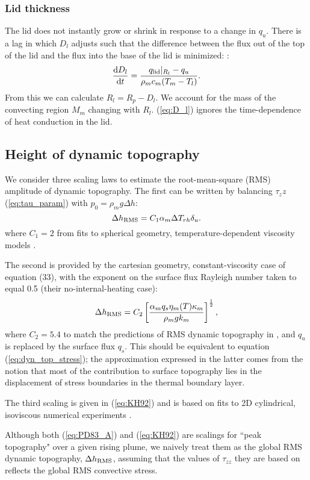 \subsubsection{Lid thickness}


The lid does not instantly grow or shrink in response to a change in $q_{u}$. There is a lag in which $D_l$ adjusts such that the difference between the flux out of the top of the lid and the flux into the base of the lid is minimized: \citep{Thiriet2019}:
\begin{equation}\label{eq:D_l}
\frac{\mathrm{d} D_l}{\mathrm{d} t} = \frac{q_{\rm lid}\vert_{R_l} -q_u}{\rho_m c_{m} (T_m - T_l)} . 
\end{equation}
From this we can calculate $R_l = R_p - D_l$. We account for the mass of the convecting region $M_m$ changing with $R_l$. (\ref{eq:D_l}) ignores the time-dependence of heat conduction in the lid.




\subsection{Height of dynamic topography}

We consider three scaling laws to estimate the root-mean-square (RMS) amplitude of dynamic topography. The first can be written by balancing  $\tau_zz$ (\ref{eq:tau_param}) with $p_0 = \rho_m g \Delta h$:
\begin{equation}\label{eq:dyn_top_stress_A}
\Delta h_{\rm RMS} = C_1 \alpha_m \Delta T_{rh} \delta_u.
\end{equation}
where $C_1 = 2$ from fits to spherical geometry, temperature-dependent viscosity models \citep{Reese2005}.

The second is provided by the cartesian geometry, constant-viscosity case of \citet{Parsons1983} equation (33), with the exponent on the surface flux Rayleigh number taken to equal 0.5 (their no-internal-heating case):
\begin{equation}\label{eq:PD83_A}
\Delta h_{\rm RMS} = C_2 \left[\frac{\alpha_m q_{s} \eta_m(T) \kappa_m}{\rho_m g k_m}\right]^\frac{1}{2},
\end{equation}
where $C_2 = 5.4$ to match the predictions of RMS dynamic topography in \citet{Lees2019}, and $q_u$ is replaced by the surface flux $q_s$. This should be equivalent to equation (\ref{eq:dyn_top_stress}); the approximation expressed in the latter comes from the notion that most of the contribution to surface topography lies in the displacement of stress boundaries in the thermal boundary layer.

The third scaling is given in (\ref{eq:KH92}) and is based on fits to 2D cylindrical, isoviscous numerical experiments \citep{Kiefer1992}.

Although both (\ref{eq:PD83_A}) and (\ref{eq:KH92}) are scalings for ``peak topography" over a given rising plume, we naively treat them as the global RMS dynamic topography, $\Delta h_{\rm RMS}$, assuming that the values of $\tau_{zz}$ they are based on reflects the global RMS convective stress.

